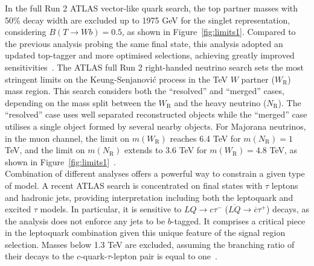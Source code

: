 \documentclass{moriond}
\begin{document}
In the full Run 2 ATLAS vector-like quark search, the top partner masses with
50\% decay width are excluded up to 1975 GeV for the singlet representation,
considering $B(T\rightarrow Wb)=0.5$, as shown in
Figure~\ref{fig:limits1}. Compared to the previous analysis
probing the same final state, this analysis adopted an updated top-tagger and
more optimised selections, achieving greatly improved sensitivities~\cite{vlq}.
The ATLAS full Run 2 right-handed neutrino search sets the most stringent
limits on the Keung-Senjanovi\'c process in the TeV $W$ partner
($W_{\mathrm{R}}$) mass region. This search considers both the ``resolved'' and
``merged'' cases, depending on the mass split between the $W_{\mathrm{R}}$ and
the heavy neutrino ($N_{\mathrm{R}}$). The ``resolved'' case uses well
separated reconstructed objects while the ``merged'' case utilises a single object
formed by several nearby objects. For Majorana neutrinos, in the muon channel,
the limit on $m(W_{\mathrm{R}})$ reaches 6.4 TeV for $m(N_{\mathrm{R}})=1$ TeV,
and the limit on $m(N_{\mathrm{R}})$ extends to 3.6 TeV for
$m(W_{\mathrm{R}})=4.8$ TeV, as shown in
Figure~\ref{fig:limits1}~\cite{rhn}.\\           

Combination of different analyses offers a powerful way to constrain a given
type of model. A recent ATLAS search is concentrated on final states with
$\tau$ leptons and hadronic jets, providing interpretation including both the
leptoquark and excited $\tau$ models. In particular, it is sensitive to
$LQ\rightarrow c\tau^{-}$ ($\overline{LQ}\rightarrow\overline{c}\tau^{+}$)
decays, as the analysis does not enforce any jets to be $b$-tagged. It
comprises a critical piece in the leptoquark combination given this unique
feature of the signal region selection. Masses below 1.3 TeV are excluded,
assuming the branching ratio of their decays to the $c$-quark-$\tau$-lepton
pair is equal to one~\cite{tau}.\\   
\end{document}
